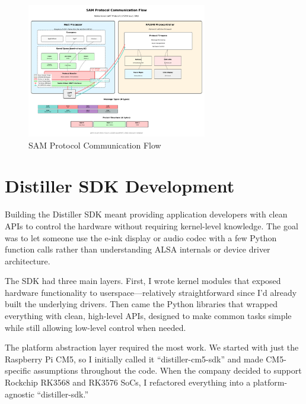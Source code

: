 \documentclass[12pt,a4paper]{report}
\begin{document}
\begin{figure}[htbp]
    \centering
    \includegraphics[width=0.7\textwidth]{sam-protocol-flow.png}
    \caption{SAM Protocol Communication Flow}
\end{figure}

\section{Distiller SDK Development}

Building the Distiller SDK meant providing application developers with clean APIs to control the hardware without requiring kernel-level knowledge. The goal was to let someone use the e-ink display or audio codec with a few Python function calls rather than understanding ALSA internals or device driver architecture.

\vspace{0.3cm}

The SDK had three main layers. First, I wrote kernel modules that exposed hardware functionality to userspace—relatively straightforward since I'd already built the underlying drivers. Then came the Python libraries that wrapped everything with clean, high-level APIs, designed to make common tasks simple while still allowing low-level control when needed.

\vspace{0.3cm}

The platform abstraction layer required the most work. We started with just the Raspberry Pi CM5, so I initially called it ``distiller-cm5-sdk'' and made CM5-specific assumptions throughout the code. When the company decided to support Rockchip RK3568 and RK3576 SoCs, I refactored everything into a platform-agnostic ``distiller-sdk.''

\vspace{0.3cm}
\end{document}
